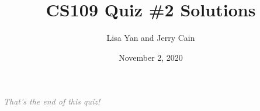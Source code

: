 \documentclass[12pt]{article}
\title{CS109 Quiz \#2 Solutions}      %
\author{Lisa Yan and Jerry Cain}
\date{November 2, 2020}               %
\begin{document}













\vfill
\begin{center}
\textcolor{gray}{\textit{That's the end of this quiz!}}
\end{center}
\newpage
\end{document}
